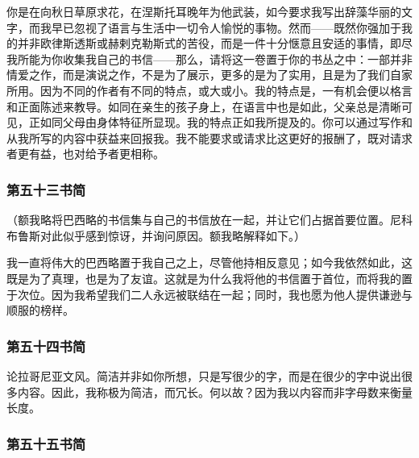 你是在向秋日草原求花，在涅斯托耳晚年为他武装，如今要求我写出辞藻华丽的文字，而我早已忽视了语言与生活中一切令人愉悦的事物。然而——既然你强加于我的并非欧律斯透斯或赫剌克勒斯式的苦役，而是一件十分惬意且安适的事情，即尽我所能为你收集我自己的书信——那么，请将这一卷置于你的书丛之中：一部并非情爱之作，而是演说之作，不是为了展示，更多的是为了实用，且是为了我们自家所用。因为不同的作者有不同的特点，或大或小。我的特点是，一有机会便以格言和正面陈述来教导。如同在亲生的孩子身上，在语言中也是如此，父亲总是清晰可见，正如同父母由身体特征所显现。我的特点正如我所提及的。你可以通过写作和从我所写的内容中获益来回报我。我不能要求或请求比这更好的报酬了，既对请求者更有益，也对给予者更相称。\par


\subsubsection{第五十三书简}

（额我略将巴西略的书信集与自己的书信放在一起，并让它们占据首要位置。尼科布鲁斯对此似乎感到惊讶，并询问原因。额我略解释如下。）\par

我一直将伟大的巴西略置于我自己之上，尽管他持相反意见；如今我依然如此，这既是为了真理，也是为了友谊。这就是为什么我将他的书信置于首位，而将我的置于次位。因为我希望我们二人永远被联结在一起；同时，我也愿为他人提供谦逊与顺服的榜样。\par


\subsubsection{第五十四书简}

论拉哥尼亚文风。简洁并非如你所想，只是写很少的字，而是在很少的字中说出很多内容。因此，我称极为简洁，而冗长。何以故？因为我以内容而非字母数来衡量长度。\par


\subsubsection{第五十五书简}

